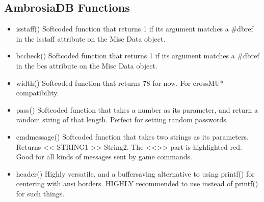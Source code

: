 \documentclass[letterpaper,10pt,english]{sphinxmanual}
\begin{document}
\subsection{AmbrosiaDB Functions}
\label{\detokenize{ambrosiadb:ambrosiadb-functions}}\begin{itemize}
\item {} 
\sphinxAtStartPar
isstaff() \sphinxhyphen{} Softcoded function that returns \textquotesingle{}1\textquotesingle{} if its argument matches
a \#dbref in the \textquotesingle{}isstaff\textquotesingle{} attribute on the Misc Data object.

\item {} 
\sphinxAtStartPar
bccheck() \sphinxhyphen{} Softcoded function that returns \textquotesingle{}1\textquotesingle{} if its argument matches
a \#dbref in the \textquotesingle{}bcs\textquotesingle{} attribute on the Misc Data object.

\item {} 
\sphinxAtStartPar
width() \sphinxhyphen{} Softcoded function that returns 78 for now. For cross\sphinxhyphen{}MU*
compatibility.

\item {} 
\sphinxAtStartPar
pass() \sphinxhyphen{} Softcoded function that takes a number as its parameter, and return
a random string of that length. Perfect for setting random passwords.

\item {} 
\sphinxAtStartPar
cmdmessage() \sphinxhyphen{} Softcoded function that takes two strings as its parameters.
Returns \textquotesingle{}\textless{}\textless{} STRING1 \textgreater{}\textgreater{} String2\textquotesingle{}. The \textless{}\textless{}\textgreater{}\textgreater{} part is highlighted red. Good for
all kinds of messages sent by game commands.

\item {} 
\sphinxAtStartPar
header() \sphinxhyphen{} Highly versatile, and a buffer\sphinxhyphen{}saving alternative
to using printf() for centering with ansi borders. HIGHLY recommended to use
instead of printf() for such things.

\end{itemize}
\end{document}
